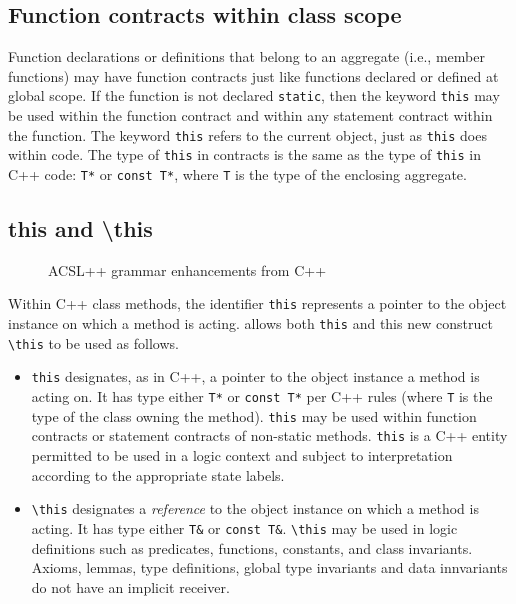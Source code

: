 
\subsection{Function contracts within class scope}

Function declarations or definitions that belong to an aggregate (i.e., member functions) may have function
contracts just like functions declared or defined at global scope. If the function is not declared \lstinline|static|, then
the keyword \lstinline|this| may be used within the function
contract and within any statement contract within the 
function. The keyword \lstinline|this| refers to the current
object, just as \lstinline|this| does within \lang code.
The type of \lstinline|this| in contracts is the same as the type of \lstinline|this| in C++ code: \lstinline|T*| or \lstinline|const T*|, where \lstinline|T| is the type of the enclosing aggregate.


\subsection{\textbf{this} and \textbf{\textbackslash this}}


\begin{figure}
\begin{cadre}

\end{cadre}
\caption{ACSL++ grammar enhancements from C++}
\label{fig:gram:this}
\end{figure}

Within C++ class methods, the identifier \lstinline|this| represents a
pointer to the object instance on which a method is acting. \NAME
allows both \lstinline|this| and this new construct \lstinline|\this| 
to be used as follows.
\begin{itemize}
\item \lstinline|this| designates, as in C++, a pointer to the object
instance a method is acting on. It has type either \lstinline|T*|
or \lstinline|const T*| per C++ rules (where \lstinline|T| is the type
of the class owning the method). \lstinline|this| may be used
within function contracts or statement contracts of non-static methods.
\lstinline|this| is a C++ entity permitted to be used in a logic context
and subject to interpretation according to the appropriate state labels.

\item \lstinline|\this| designates a \textit{reference} to the object
instance on which a method is acting. It has type either \lstinline|T&| or
\lstinline|const T&|. 
\lstinline|\this| may be used in logic definitions
such as predicates, functions, constants, and class invariants. Axioms, lemmas, type definitions, global type invariants and data innvariants
do not have an implicit receiver.

\end{itemize}

